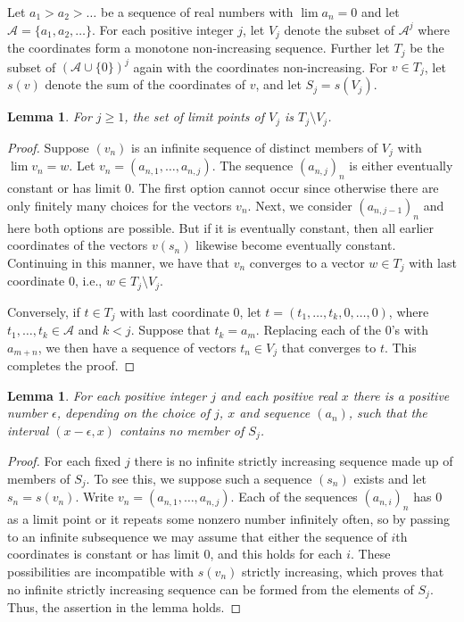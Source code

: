 \documentclass[12pt]{amsart}
\newtheorem{lemma}[theorem]{Lemma}
\theoremstyle{definition}
\theoremstyle{remark}
\numberwithin{equation}{section}
\begin{document}
Let $a_1>a_2>\dots$ be a sequence of real numbers with $\lim a_n=0$ and let
$\mathcal A=\{a_1,a_2,\dots\}$.
For each positive integer $j$, let $V_j$ denote the subset of $\mathcal A^j$ where
the coordinates form a monotone non-increasing sequence.  Further let 
$T_j$ be the subset of $(\mathcal A\cup\{0\})^j$ again with the coordinates non-increasing.
For $v\in T_j$, let $s(v)$ denote the sum of the coordinates of $v$, and let $S_j=s(V_j)$.

 \begin{lemma}
 For $j\ge1$, the set of limit points of $V_j$ is $T_j\setminus V_j$.
 \end{lemma}
 \begin{proof}
 Suppose $(v_n)$ is an infinite sequence of distinct members of $V_j$ with $\lim v_n=w$.
 Let $v_n=(a_{n,1},\dots,a_{n,j})$.  The sequence $(a_{n,j})_n$ is
 either eventually constant or has limit 0.  The first option cannot occur since otherwise
 there are only finitely many choices for the vectors $v_n$.  Next, we consider $(a_{n,j-1})_n$
 and here both options are possible.  But if it is eventually constant, then all earlier
 coordinates of the vectors $v(s_n)$ likewise become eventually constant.  Continuing
 in this manner, we have that $v_n$ converges to a vector $w\in T_j$ with last coordinate 0,
 i.e., $w\in T_j\setminus V_j$.
  
 Conversely, if $t\in T_j$ with last coordinate 0, let $t=(t_1,\dots,t_k,0,\dots,0)$, where
 $t_1,\dots,t_k\in\mathcal A$ and $k<j$.  Suppose that $t_k=a_m$.   Replacing
 each of the 0's with $a_{m+n}$, we then have a sequence of vectors $t_n\in V_j$ 
 that converges to $t$.  This completes the proof.
 \end{proof}
 
\begin{lemma}
For each positive integer $j$ and each positive real $x$ there is a positive number $\epsilon$,
depending on the choice of $j$, $x$ and sequence $(a_n)$,
such that the interval $(x-\epsilon,x)$ contains no member of $S_j$.
\end{lemma}
\begin{proof}
For each fixed $j$ there is no infinite strictly increasing 
sequence made up of members of $S_j$.  To see this, we suppose such a sequence $(s_n)$
exists and let $s_n=s(v_n)$.   Write $v_n=(a_{n,1},\dots,a_{n,j})$.  Each of the sequences
$(a_{n,i})_n$ has 0 as a limit point or it repeats some nonzero number infinitely often, so
by passing to an infinite subsequence we may assume that either the sequence of $i$th
coordinates is constant or has limit 0, and this holds for each $i$.  These possibilities
are incompatible with $s(v_n)$ strictly increasing,
 which proves that no
infinite strictly increasing sequence can be formed from the elements of $S_j$.  Thus,
the assertion in the lemma holds.
\end{proof}
\end{document}
